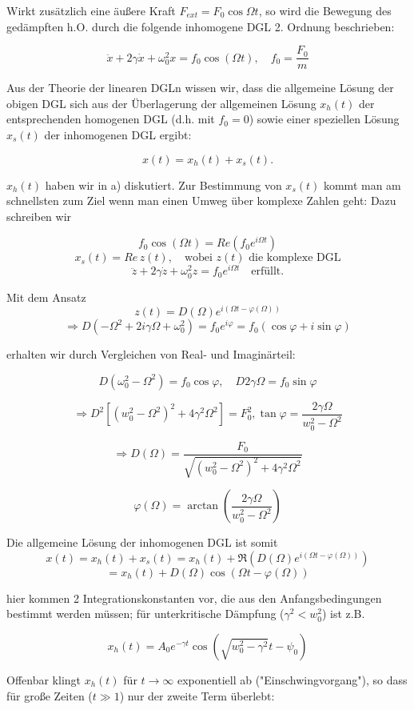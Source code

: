 \documentclass[10pt, letterpaper]{article}
\begin{document}
Wirkt zusätzlich eine äußere Kraft $F_{ext} = F_0 \cos \Omega t$, so wird die Bewegung des gedämpften h.O. durch die folgende inhomogene DGL 2. Ordnung beschrieben:

\[\ddot{x} + 2\gamma \dot{x} + \omega_0^2 x = f_0 \cos(\Omega t), \quad f_0 = \frac{F_0}{m}\]

Aus der Theorie der linearen DGLn wissen wir, dass die allgemeine Lösung der obigen DGL sich aus der Überlagerung der allgemeinen Lösung $x_h(t)$ der entsprechenden homogenen DGL (d.h. mit $f_0 = 0$) sowie einer speziellen Lösung $x_s(t)$ der inhomogenen DGL ergibt:

\[x(t) = x_h(t) + x_s(t).\]

$x_h(t)$ haben wir in a) diskutiert. Zur Bestimmung von $x_s(t)$ kommt man am schnellsten zum Ziel wenn man einen Umweg über komplexe Zahlen geht: Dazu schreiben wir

\[f_0 \cos(\Omega t) = Re(f_0 e^{i\Omega t})\]
\[x_s(t) = Re\, z(t), \quad \text{wobei } z(t) \text{ die komplexe DGL}\]
\[\ddot{z} + 2\gamma \dot{z} + \omega_0^2 z = f_0 e^{i\Omega t} \quad \text{erfüllt}.\]

Mit dem Ansatz \[z(t) = D(\Omega) e^{i(\Omega t - \varphi(\Omega))}\]
\[\Rightarrow D(-\Omega^2 + 2i\gamma\Omega + \omega_0^2) = f_0 e^{i\varphi} = f_0(\cos\varphi + i\sin\varphi)\]

erhalten wir durch Vergleichen von Real- und Imaginärteil:

\[D(\omega_0^2-\Omega^2) = f_0\cos\varphi, \quad D2\gamma\Omega = f_0\sin\varphi\]


\[\Rightarrow D^2[(w_0^2-\Omega^2)^2 + 4\gamma^2\Omega^2] = F_0^2, \tan\varphi = \frac{2\gamma\Omega}{w_0^2-\Omega^2}\]

\[\Rightarrow D(\Omega) = \frac{F_0}{\sqrt{(w_0^2-\Omega^2)^2 + 4\gamma^2\Omega^2}}\]

\[\varphi(\Omega) = \arctan\left(\frac{2\gamma\Omega}{w_0^2-\Omega^2}\right)\]

Die allgemeine Lösung der inhomogenen DGL ist somit
\[x(t) = x_h(t) + x_s(t) = x_h(t) + \Re(D(\Omega)e^{i(\Omega t-\varphi(\Omega))})\]
\[= x_h(t) + D(\Omega)\cos(\Omega t-\varphi(\Omega))\]

hier kommen 2 Integrationskonstanten vor, die aus den Anfangsbedingungen bestimmt werden müssen; für unterkritische Dämpfung ($\gamma^2<w_0^2$) ist z.B.

\[x_h(t) = A_0e^{-\gamma t}\cos(\sqrt{w_0^2-\gamma^2}t-\psi_0)\]

Offenbar klingt $x_h(t)$ für $t\to\infty$ exponentiell ab ("Einschwingvorgang"), so dass für große Zeiten ($t\gg1$) nur der zweite Term überlebt:
\end{document}
